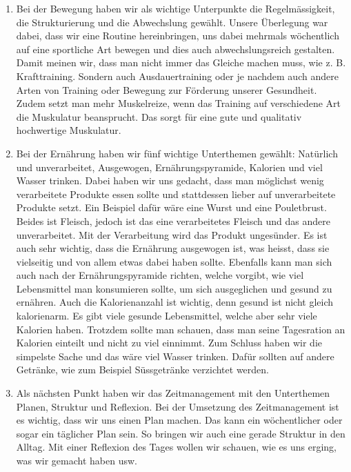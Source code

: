 \begin{enumerate}
  \item Bei der Bewegung haben wir als wichtige Unterpunkte die Regelmässigkeit, die Strukturierung und die Abwechslung gewählt. Unsere Überlegung war dabei, dass wir eine Routine hereinbringen, uns dabei mehrmals wöchentlich auf eine sportliche Art bewegen und dies auch abwechslungsreich gestalten. Damit meinen wir, dass man nicht immer das Gleiche machen muss, wie z. B. Krafttraining. Sondern auch Ausdauertraining oder je nachdem auch andere Arten von Training oder Bewegung zur Förderung unserer Gesundheit. Zudem setzt man mehr Muskelreize, wenn das Training auf verschiedene Art die Muskulatur beansprucht. Das sorgt für eine gute und qualitativ hochwertige Muskulatur.
  \item Bei der Ernährung haben wir fünf wichtige Unterthemen gewählt: Natürlich und unverarbeitet, Ausgewogen, Ernährungspyramide, Kalorien und viel Wasser trinken. Dabei haben wir uns gedacht, dass man möglichst wenig verarbeitete Produkte essen sollte und stattdessen lieber auf unverarbeitete Produkte setzt. Ein Beispiel dafür wäre eine Wurst und eine Pouletbrust. Beides ist Fleisch, jedoch ist das eine verarbeitetes Fleisch und das andere unverarbeitet. Mit der Verarbeitung wird das Produkt ungesünder. Es ist auch sehr wichtig, dass die Ernährung ausgewogen ist, was heisst, dass sie vielseitig und von allem etwas dabei haben sollte. Ebenfalls kann man sich auch nach der Ernährungspyramide richten, welche vorgibt, wie viel Lebensmittel man konsumieren sollte, um sich ausgeglichen und gesund zu ernähren. Auch die Kalorienanzahl ist wichtig, denn gesund ist nicht gleich kalorienarm. Es gibt viele gesunde Lebensmittel, welche aber sehr viele Kalorien haben. Trotzdem sollte man schauen, dass man seine Tagesration an Kalorien einteilt und nicht zu viel einnimmt. Zum Schluss haben wir die simpelste Sache und das wäre viel Wasser trinken. Dafür sollten auf andere Getränke, wie zum Beispiel Süssgetränke verzichtet werden.
  \item Als nächsten Punkt haben wir das Zeitmanagement mit den Unterthemen Planen, Struktur und Reflexion. Bei der Umsetzung des Zeitmanagement ist es wichtig, dass wir uns einen Plan machen. Das kann ein wöchentlicher oder sogar ein täglicher Plan sein. So bringen wir auch eine gerade Struktur in den Alltag. Mit einer Reflexion des Tages wollen wir schauen, wie es uns erging, was wir gemacht haben usw.

\end{enumerate}
